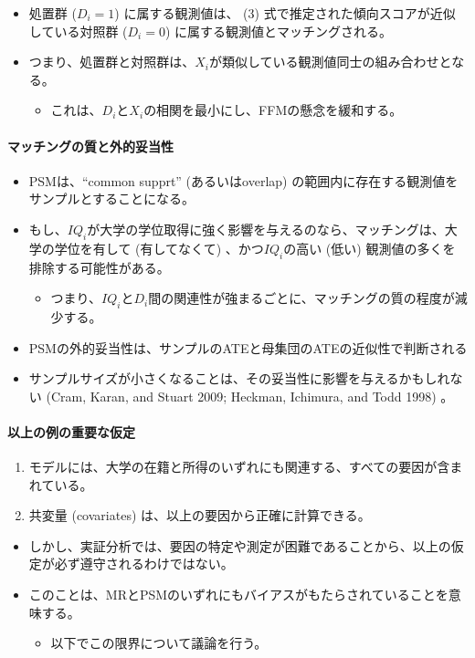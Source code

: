 \begin{itemize}
 \item 処置群 ($D_i=1$) に属する観測値は、 (3) 式で推定された傾向スコアが近似している対照群 ($D_i=0$) に属する観測値とマッチングされる。
 \item つまり、処置群と対照群は、$X_i$が類似している観測値同士の組み合わせとなる。
  \begin{itemize}
   \item これは、$D_i$と$X_i$の相関を最小にし、FFMの懸念を緩和する。
  \end{itemize}
\end{itemize}

\paragraph{マッチングの質と外的妥当性}

\begin{itemize}
 \item PSMは、“common supprt” (あるいはoverlap) の範囲内に存在する観測値をサンプルとすることになる。
 \item もし、$IQ_i$が大学の学位取得に強く影響を与えるのなら、マッチングは、大学の学位を有して (有してなくて) 、かつ$IQ_i$の高い (低い) 観測値の多くを排除する可能性がある。
  \begin{itemize}
   \item つまり、$IQ_i$と$D_i$間の関連性が強まるごとに、マッチングの質の程度が減少する。
  \end{itemize}
 \item PSMの外的妥当性は、サンプルのATEと母集団のATEの近似性で判断される
 \item サンプルサイズが小さくなることは、その妥当性に影響を与えるかもしれない (Cram, Karan, and Stuart 2009; Heckman, Ichimura, and Todd 1998) 。
\end{itemize}
 
\paragraph{以上の例の重要な仮定}

\begin{enumerate}
 \item モデルには、大学の在籍と所得のいずれにも関連する、すべての要因が含まれている。
 \item 共変量 (covariates) は、以上の要因から正確に計算できる。
\end{enumerate}
\begin{itemize}
 \item しかし、実証分析では、要因の特定や測定が困難であることから、以上の仮定が必ず遵守されるわけではない。
 \item このことは、MRとPSMのいずれにもバイアスがもたらされていることを意味する。
  \begin{itemize}
   \item 以下でこの限界について議論を行う。
  \end{itemize}
\end{itemize}

